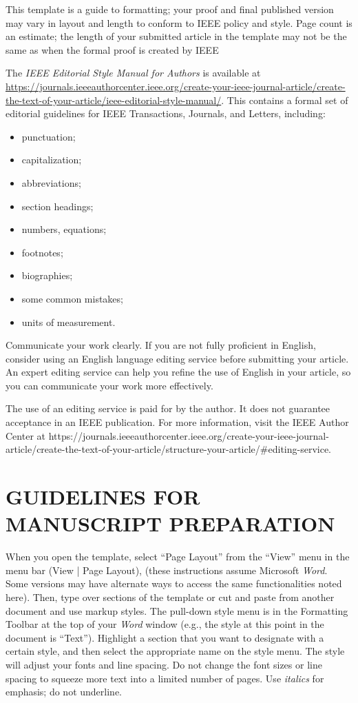\documentclass{IEEEtaes}
\begin{document}
This template is a guide to formatting; your proof and final published version may vary in layout and length to conform to IEEE policy and style. Page count is an estimate; the length of your submitted article in the template may not be the same as when the formal proof is created by IEEE

The {\it IEEE Editorial Style Manual for Authors} is available at 
\href{https://journals.ieeeauthorcenter.ieee.org/create-your-ieee-journal-article/create-the-text-of-your-article/ieee-editorial-style-manual/}{%
{https://journals.ieeeauthorcenter.ieee.org/create-your-ieee-journal-article/create-the-text-of-your-article/\break ieee-editorial-style-manual/}}. This contains a formal set of editorial guidelines for IEEE Transactions, Journals, and Letters, including:
\begin{itemize}
\item punctuation;
\item capitalization;
\item abbreviations;
\item section headings;
\item numbers, equations;
\item footnotes;
\item biographies;
\item some common mistakes;
\item units of measurement.
\end{itemize}

Communicate your work clearly. If you are not fully proficient in English, consider using an English language editing service before submitting your article. An expert editing service can help you refine the use of English in your article, so you can communicate your work more effectively.

The use of an editing service is paid for by the author. It does not guarantee acceptance in an IEEE publication. For more information, visit the IEEE Author Center at {https://journals.ieeeauthorcenter.ieee.org/create-your-ieee-journal-article/create-the-text-of-your-article/structure-your-article/\#editing-service}.

\section{GUIDELINES FOR MANUSCRIPT PREPARATION}

When you open the template, select ``Page Layout'' from the ``View'' menu in the menu bar (View | Page Layout), (these instructions assume Microsoft {\it Word}. Some versions may have alternate ways to access the same functionalities noted here). Then, type over sections of the template or cut and paste from another document and use markup styles. The pull-down style menu is in the Formatting Toolbar at the top of your {\it Word} window (e.g., the style at this point in the document is ``Text''). Highlight a section that you want to designate with a certain style, and then select the appropriate name on the style menu. The style will adjust your fonts and line spacing. Do not change the font sizes or line spacing to squeeze more text into a limited number of pages. Use {\it italics} for emphasis; do not underline.
\end{document}

